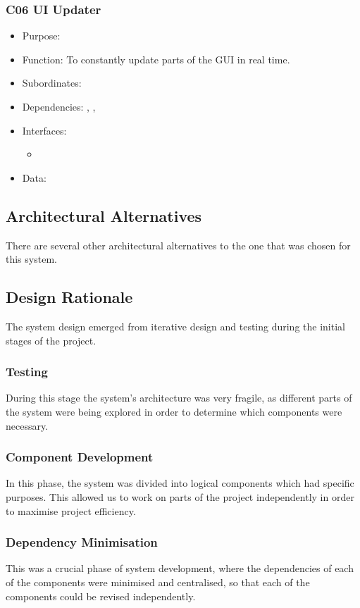 \subsubsection{C06 UI Updater} \label{compUIUpdater}
\begin{itemize}
	\item Purpose: 
	\item Function: To constantly update parts of the GUI in real time. 
	\item Subordinates:
	\item Dependencies: , , 
	\item Interfaces:
	\begin{itemize}
		\item 
	\end{itemize}
	\item Data:
\end{itemize}

\subsection{Architectural Alternatives}
There are several other architectural alternatives to the one that was chosen for this system.

\subsection{Design Rationale}
The system design emerged from iterative design and testing during the initial stages of the project.

\subsubsection{Testing}
During this stage the system's architecture was very fragile, as different parts of the system were being explored in order to determine which components were necessary.

\subsubsection{Component Development}
In this phase, the system was divided into logical components which had specific purposes. This allowed us to work on parts of the project independently in order to maximise project efficiency.

\subsubsection{Dependency Minimisation}
This was a crucial phase of system development, where the dependencies of each of the components were minimised and centralised, so that each of the components could be revised independently.
